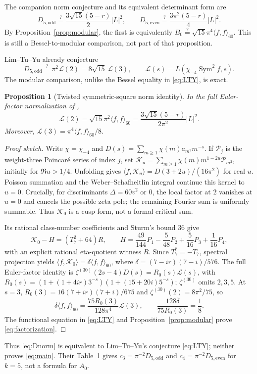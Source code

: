 \documentclass[11pt]{article}
\numberwithin{equation}{section}
\newtheorem{proposition}[theorem]{Proposition}
\theoremstyle{definition}
\theoremstyle{remark}
\theoremstyle{plain}
\newcommand{\De}{D_{5,\mathrm{even}}}
\newcommand{\Do}{D_{5,\mathrm{odd}}}
\begin{document}
The companion norm conjecture and its equivalent determinant form are
\begin{equation}\label{eq:Dnorm}
 \boxed{\Do\stackrel?=\frac{3\sqrt{15}(5-r)}2|L|^2,
 \qquad \De\stackrel?=\frac{3\pi^2(5-r)}4|L|^2.}
\end{equation}
By Proposition~\ref{prop:modular}, the first is equivalently
$B_0\stackrel?=\sqrt{15}\pi^4\langle f,f\rangle_{60}$.
This is still a Bessel-to-modular comparison, not part of that proposition.

Lim--Tu--Yu already conjecture \cite[eq.~(44)]{LTY}
\begin{equation}\label{eq:LTY}
 \Do\stackrel?=\pi^2\mathscr L(2)=8\sqrt{15}\,\mathscr L(3),
 \qquad \mathscr L(s)=L(\chi_{-4}\operatorname{Sym}^2f,s).
\end{equation}
The modular comparison, unlike the Bessel equality in \eqref{eq:LTY}, is exact.
\begin{proposition}[Twisted symmetric-square norm identity]\label{prop:criticalnorm}
In the full Euler-factor normalization of \cite{LTY},
\begin{equation}\label{eq:factorization}
 \boxed{\mathscr L(2)=\sqrt{15}\pi^2\langle f,f\rangle_{60}
 =\frac{3\sqrt{15}(5-r)}{2\pi^2}|L|^2.}
\end{equation}
Moreover, $\mathscr L(3)=\pi^4\langle f,f\rangle_{60}/8$.
\end{proposition}
\begin{proof}[Proof sketch]
Write $\chi=\chi_{-4}$ and
$D(s)=\sum_{m\ge1}\chi(m)a_{m^2}m^{-s}$.
If $\mathcal P_j$ is the weight-three Poincar\'e series of index $j$, set
$\mathcal K_u=\sum_{m\ge1}\chi(m)m^{1-2u}\mathcal P_{m^2}$, initially for
$\Re u>1/4$. Unfolding gives
$\langle f,\mathcal K_u\rangle=D(3+2u)/(16\pi^2)$ for real $u$.
Poisson summation and the Weber--Schafheitlin integral \cite[\S10.22(iv)]{DLMF}
continue this kernel to $u=0$.
Crucially, for discriminants $\Delta=60v^2$ or $0$, the local factor at $2$
vanishes at $u=0$ and cancels the possible zeta pole; the remaining Fourier
sum is uniformly summable. Thus $\mathcal K_0$ is a cusp form, not a formal
critical sum.

Its rational class-number coefficients and Sturm's bound $36$ give
\[
 \mathcal K_0-H=(T_7^2+64)R,\qquad
 H=\frac{49}{144}P_1-\frac5{48}P_2+\frac5{16}P_3+\frac1{16}P_4,
\]
with an explicit rational eta-quotient witness $R$.
Since $T_7^*=-T_7$, spectral projection yields
$\langle f,\mathcal K_0\rangle=\bar\delta\langle f,f\rangle_{60}$,
where $\delta=(7-ir)(7-i)/576$.
The full Euler-factor identity is
$\zeta^{(30)}(2s-4)D(s)=R_0(s)\mathscr L(s)$, with
$R_0(s)=(1+(1+4ir)3^{-s})(1+(15+20i)5^{-s})$;
$\zeta^{(30)}$ omits $2,3,5$.
At $s=3$, $R_0(3)=16(7+ir)(7+i)/675$ and
$\zeta^{(30)}(2)=8\pi^2/75$, so
\[
 \bar\delta\langle f,f\rangle_{60}
 =\frac{75R_0(3)}{128\pi^4}\mathscr L(3),\qquad
 \frac{128\bar\delta}{75R_0(3)}=\frac18.
\]
The functional equation in \eqref{eq:LTY} and Proposition~\ref{prop:modular}
prove \eqref{eq:factorization}.
\end{proof}
Thus \eqref{eq:Dnorm} is equivalent to Lim--Tu--Yu's conjecture \eqref{eq:LTY};
neither proves \eqref{eq:main}. Their Table~1 gives $c_3=\pi^{-2}\Do$ and
$c_4=\pi^{-2}\De$ for $k=5$, not a formula for $A_0$.
\end{document}
